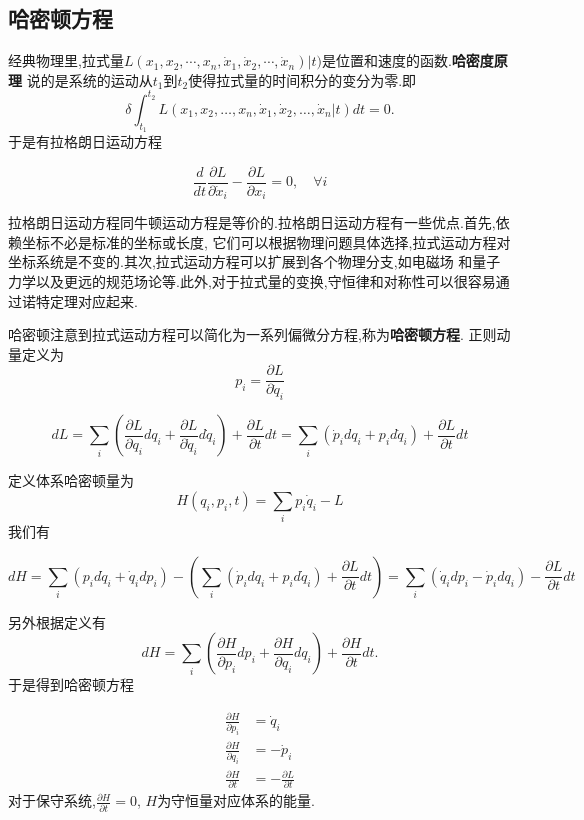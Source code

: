 \subsection{哈密顿方程}
经典物理里,拉式量$L(x_1, x_2, \cdots, x_n, \dot{x}_1, \dot{x}_2, \cdots, \dot{x}_n)|t)$是位置和速度的函数.\textbf{哈密度原理}
说的是系统的运动从$t_1$到$t_2$使得拉式量的时间积分的变分为零.即
\begin{equation}
    \delta \int_{t_1}^{t_2} L\left(x_1, x_2, \ldots, x_n, \dot{x}_1, \dot{x}_2, \ldots, \dot{x}_n | t\right) d t=0 .
\end{equation}
于是有拉格朗日运动方程

\begin{equation}
    \frac{d}{d t} \frac{\partial L}{\partial \dot{x}_i}-\frac{\partial L}{\partial x_i}=0, \quad \forall i
\end{equation}

拉格朗日运动方程同牛顿运动方程是等价的.拉格朗日运动方程有一些优点.首先,依赖坐标不必是标准的坐标或长度,
它们可以根据物理问题具体选择,拉式运动方程对坐标系统是不变的.其次,拉式运动方程可以扩展到各个物理分支,如电磁场
和量子力学以及更远的规范场论等.此外,对于拉式量的变换,守恒律和对称性可以很容易通过诺特定理对应起来.


哈密顿注意到拉式运动方程可以简化为一系列偏微分方程,称为\textbf{哈密顿方程}.
正则动量定义为
\begin{equation}
    p_i=\frac{\partial L}{\partial \dot{q}_i}
\end{equation}

\begin{equation}
    d L=\sum_i\left(\frac{\partial L}{\partial q_i} d q_i+\frac{\partial L}{\partial \dot{q}_i} d \dot{q}_i\right)+\frac{\partial L}{\partial t} d t=\sum_i\left(\dot{p}_i d q_i+p_i d \dot{q}_i\right)+\frac{\partial L}{\partial t} d t
\end{equation}

定义体系哈密顿量为
\begin{equation}
    H(q_i, p_i, t)=\sum_i p_i \dot{q}_i-L 
\end{equation}
我们有

\begin{equation}
    d H=\sum_i\left(p_i d \dot{q}_i+\dot{q}_i d p_i\right)-\left(\sum_i\left(\dot{p}_i d q_i+p_i d \dot{q}_i\right)+\frac{\partial L}{\partial t} d t\right)=\sum_i\left(\dot{q}_i d p_i-\dot{p}_i d q_i\right)-\frac{\partial L}{\partial t} d t
\end{equation}

另外根据定义有
\begin{equation}
    d H=\sum_i\left(\frac{\partial H}{\partial p_i} d p_i+\frac{\partial H}{\partial q_i} d q_i\right)+\frac{\partial H}{\partial t} d t .
\end{equation}
于是得到哈密顿方程

\begin{align}
    \frac{\partial H}{\partial p_i}&=\dot{q}_i
    \\
    \frac{\partial H}{\partial q_i}&=-\dot{p}_i
    \\
    \frac{\partial H}{\partial t}&=-\frac{\partial L}{\partial t}
\end{align}
对于保守系统,$\frac{\partial H}{\partial t}=0$, $H$为守恒量对应体系的能量.